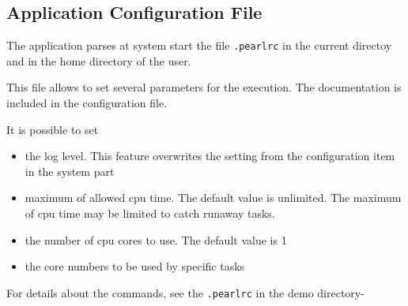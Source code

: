 \subsection{Application Configuration File}

The application parses at system start the file \texttt{.pearlrc} in
the current directoy and in the home directory of the user.

This file allows to set several parameters for the execution.
The documentation is included in the configuration file.

It is possible to set
\begin{itemize}
\item the log level. This feature overwrites the setting 
   from the configuration item in the system part
\item maximum of allowed cpu time. The default value is unlimited. 
   The maximum of cpu time may be limited to catch runaway tasks.
\item the number of cpu cores to use. The default value is 1
\item the core numbers to be used by specific tasks
\end{itemize}

For details about the commands, see the \texttt{.pearlrc} in the demo directory-


